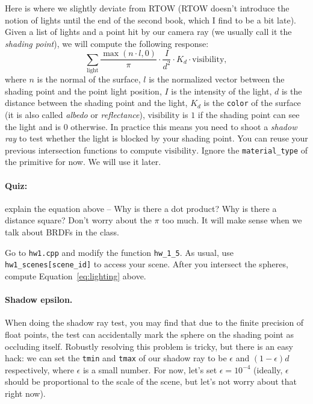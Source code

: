 Here is where we slightly deviate from RTOW (RTOW doesn't introduce the notion of lights until the end of the second book, which I find to be a bit late). Given a list of lights and a point hit by our camera ray (we usually call it the \emph{shading point}), we will compute the following response:
\begin{equation}
    \sum_{\text{light}} \frac{\max\left(n \cdot l, 0\right)}{\pi} \cdot \frac{I}{d^2} \cdot K_d \cdot \text{visibility},
    \label{eq:lighting}
\end{equation}
where $n$ is the normal of the surface, $l$ is the normalized vector between the shading point and the point light position, $I$ is the intensity of the light, $d$ is the distance between the shading point and the light, $K_d$ is the \lstinline{color} of the surface (it is also called \emph{albedo} or \emph{reflectance}), $\text{visibility}$ is $1$ if the shading point can see the light and is $0$ otherwise. In practice this means you need to shoot a \emph{shadow ray} to test whether the light is blocked by your shading point. You can reuse your previous intersection functions to compute $\text{visibility}$. Ignore the \lstinline{material_type} of the primitive for now. We will use it later.

\paragraph{Quiz:} explain the equation above -- Why is there a dot product? Why is there a distance square? Don't worry about the $\pi$ too much. It will make sense when we talk about BRDFs in the class.

Go to \lstinline{hw1.cpp} and modify the function \lstinline{hw_1_5}. As usual, use \lstinline{hw1_scenes[scene_id]} to access your scene. After you intersect the spheres, compute Equation~\eqref{eq:lighting} above.

\paragraph{Shadow epsilon.} When doing the shadow ray test, you may find that due to the finite precision of float points, the test can accidentally mark the sphere on the shading point as occluding itself. Robustly resolving this problem is tricky, but there is an easy hack: we can set the \lstinline{tmin} and \lstinline{tmax} of our shadow ray to be $\epsilon$ and $\left(1 - \epsilon\right) d$ respectively, where $\epsilon$ is a small number. For now, let's set $\epsilon = 10^{-4}$ (ideally, $\epsilon$ should be proportional to the scale of the scene, but let's not worry about that right now).

